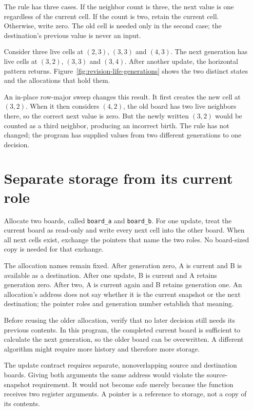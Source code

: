 The rule has three cases. If the neighbor count is three, the
next value is one regardless of the current cell. If the count is two, retain the
current cell. Otherwise, write zero. The old cell is needed only in the second
case; the destination's previous value is never an input.

Consider three live cells at $(2,3)$, $(3,3)$ and $(4,3)$. The next generation has
live cells at $(3,2)$, $(3,3)$ and $(3,4)$. After another update, the horizontal
pattern returns. Figure~\ref{fig:revision-life-generations} shows the two distinct
states and the allocations that hold them.



An in-place row-major sweep changes this result. It first creates the new cell
at $(3,2)$. When it then considers $(4,2)$, the old board has two live neighbors
there, so the correct next value is zero. But the newly written $(3,2)$ would be
counted as a third neighbor, producing an incorrect birth. The rule has not changed;
the program has supplied values from two different generations to one decision.

\section{Separate storage from its current role}

Allocate two boards, called \texttt{board\_a} and \texttt{board\_b}. For one update,
treat the current board as read-only and write every next cell into the other
board. When all next cells exist, exchange the pointers that name the two roles.
No board-sized copy is needed for that exchange.

The allocation names remain fixed. After generation zero, A is current and B is
available as a destination. After one update, B is current and A retains generation
zero. After two, A is current again and B retains generation one. An allocation's
address does not say whether it is the current snapshot or the next destination;
the pointer roles and generation number establish that meaning.

Before reusing the older allocation, verify that no later decision still needs
its previous contents. In this program, the completed current board is sufficient
to calculate the next generation, so the older board can be overwritten. A different
algorithm might require more history and therefore more storage.

The update contract requires separate, nonoverlapping source and destination
boards. Giving both arguments the same address would violate the source-snapshot
requirement. It would not become safe merely because the function receives two
register arguments. A pointer is a reference to storage, not a copy of its contents.

